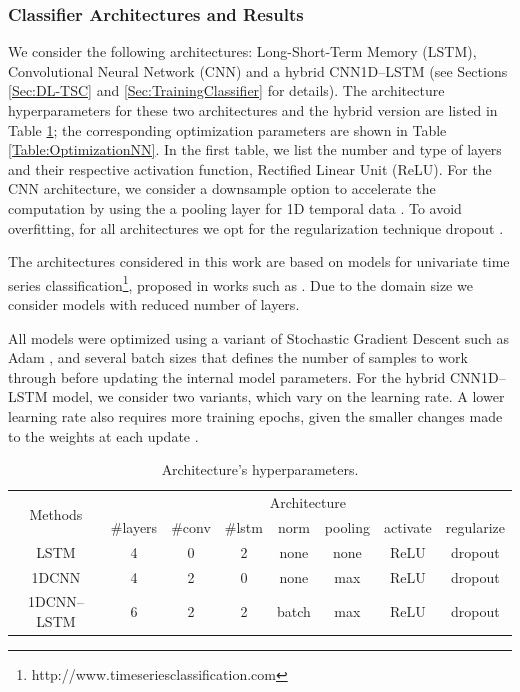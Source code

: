 \subsubsection{Classifier Architectures and Results}
\label{Sec:TSC_NN_Results}

We consider the following architectures: Long-Short-Term Memory (LSTM), Convolutional Neural Network (CNN) and a hybrid CNN1D--LSTM (see Sections \ref{Sec:DL-TSC} and \ref{Sec:TrainingClassifier} for details). The architecture hyperparameters for these two architectures and the hybrid version are listed in Table \ref{Table:HyperparametersNN}; the corresponding optimization parameters are shown in Table \ref{Table:OptimizationNN}. In the first table, we list the number and type of layers and their respective activation function, Rectified Linear Unit (ReLU). For the CNN architecture, we consider a downsample option to accelerate the computation by using the a pooling layer for 1D temporal data \cite{Gholamalinezhad2020}. To avoid overfitting, for all architectures we opt for the regularization technique dropout \cite{Srivastava2014, Baldi2013}. 

The architectures considered in this work are based on models for univariate time series classification\footnote{http://www.timeseriesclassification.com}, proposed in works such as \cite{Bagnall2017a, Fawaz2019}. Due to the domain size we consider models with reduced number of layers.

All models were optimized using a variant of Stochastic Gradient Descent such as Adam \cite{Kingma2015}, and several batch sizes that defines the number of samples to work through before updating the internal model parameters. For the hybrid CNN1D--LSTM model, we consider two variants, which vary on the learning rate. A lower learning rate also requires more training epochs, given the smaller changes made to the weights at each update \cite{Patterson2017}.

\begin{table}[h]
	\centering
	\small
	\begin{tabular}{|c|c|c|c|c|c|c|c|}
		\hline
		\multirow{2}{*}{Methods} & \multicolumn{7}{c|}{Architecture} \\
		\cline{2-8}
		& \#layers & \#conv & \#lstm & norm & pooling & activate & regularize \\
		\cline{2-8}
		\hline
		LSTM & 4 & 0 & 2 & none & none & ReLU & dropout \\
		\hline
		1DCNN & 4 & 2 & 0 & none & max & ReLU & dropout \\
		\hline
		1DCNN--LSTM & 6 & 2 & 2 & batch & max & ReLU & dropout  \\
		\hline
	\end{tabular}
	\caption{Architecture’s hyperparameters.}
	\label{Table:HyperparametersNN}
\end{table}

